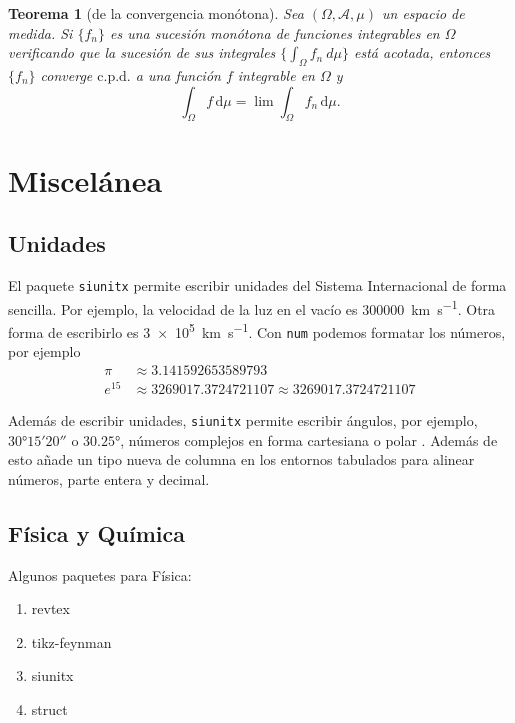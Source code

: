\documentclass[11pt]{article}
\numberwithin{equation}{section} %
\theoremstyle{plain}                            %
\newtheorem{teorema}{Teorema}[section]
\theoremstyle{definition}                       %
\theoremstyle{remark}                           %
\begin{document}
\begin{teorema}[de la convergencia monótona]
      Sea $(\Omega,\mathcal{A},\mu)$ un espacio de medida. Si $\{f_n\}$ es una sucesión monótona de funciones integrables en $\Omega$  verificando que la sucesión de sus integrales $\big
            \{\int_{\Omega}f_n\  d\mu \big \}$ está acotada, entonces $\{f_n\}$ converge $\text{c.p.d.}$ a una función $f$ integrable en $\Omega$ y
      \[
            \int_{\Omega}f\, \mathrm{d}\mu=\lim \int_{\Omega}f_n\, \mathrm{d}\mu .
      \]
\end{teorema}

\section{Miscelánea}

\subsection{Unidades}

El paquete \texttt{siunitx} permite escribir unidades del Sistema Internacional de forma sencilla. Por ejemplo, la velocidad de la luz en el vacío es \SI{300000}{\km\per\second}. Otra forma de escribirlo es \SI{3e5}{\km\per\second}. Con \texttt{num} podemos formatar los números, por ejemplo 
\[
      \begin{split}
      \pi & \approx\num{3.141592653589793} \\
      e^{15} & \approx \num{3269017.3724721107} \approx \num[scientific-notation=true]{3269017.3724721107}
      \end{split}
\]      

Además de escribir unidades, \texttt{siunitx} permite escribir ángulos, por ejemplo, $\ang{30;15;20}$ o $\ang{30.25}$, números complejos  en forma cartesiana o polar . Además de esto añade un tipo nueva de columna en los entornos tabulados para alinear números, parte entera y decimal.

\subsection{Física y Química}

Algunos paquetes para Física:
      \begin{enumerate}
            \item revtex
            \item tikz-feynman
            \item siunitx
            \item struct
      \end{enumerate}
\end{document}

